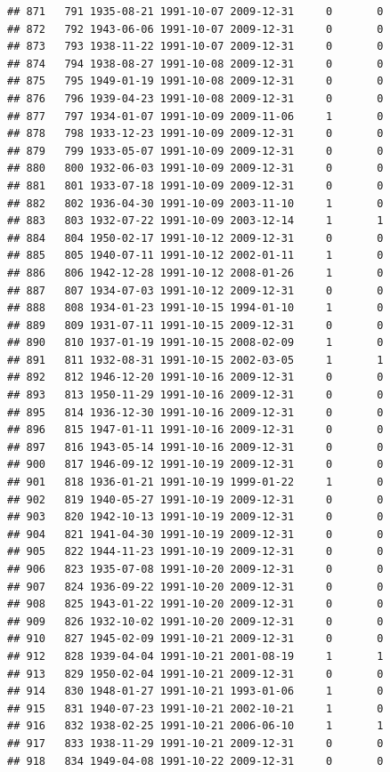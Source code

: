 \documentclass[
]{book}
\begin{document}
\begin{verbatim}
## 871   791 1935-08-21 1991-10-07 2009-12-31     0       0
## 872   792 1943-06-06 1991-10-07 2009-12-31     0       0
## 873   793 1938-11-22 1991-10-07 2009-12-31     0       0
## 874   794 1938-08-27 1991-10-08 2009-12-31     0       0
## 875   795 1949-01-19 1991-10-08 2009-12-31     0       0
## 876   796 1939-04-23 1991-10-08 2009-12-31     0       0
## 877   797 1934-01-07 1991-10-09 2009-11-06     1       0
## 878   798 1933-12-23 1991-10-09 2009-12-31     0       0
## 879   799 1933-05-07 1991-10-09 2009-12-31     0       0
## 880   800 1932-06-03 1991-10-09 2009-12-31     0       0
## 881   801 1933-07-18 1991-10-09 2009-12-31     0       0
## 882   802 1936-04-30 1991-10-09 2003-11-10     1       0
## 883   803 1932-07-22 1991-10-09 2003-12-14     1       1
## 884   804 1950-02-17 1991-10-12 2009-12-31     0       0
## 885   805 1940-07-11 1991-10-12 2002-01-11     1       0
## 886   806 1942-12-28 1991-10-12 2008-01-26     1       0
## 887   807 1934-07-03 1991-10-12 2009-12-31     0       0
## 888   808 1934-01-23 1991-10-15 1994-01-10     1       0
## 889   809 1931-07-11 1991-10-15 2009-12-31     0       0
## 890   810 1937-01-19 1991-10-15 2008-02-09     1       0
## 891   811 1932-08-31 1991-10-15 2002-03-05     1       1
## 892   812 1946-12-20 1991-10-16 2009-12-31     0       0
## 893   813 1950-11-29 1991-10-16 2009-12-31     0       0
## 895   814 1936-12-30 1991-10-16 2009-12-31     0       0
## 896   815 1947-01-11 1991-10-16 2009-12-31     0       0
## 897   816 1943-05-14 1991-10-16 2009-12-31     0       0
## 900   817 1946-09-12 1991-10-19 2009-12-31     0       0
## 901   818 1936-01-21 1991-10-19 1999-01-22     1       0
## 902   819 1940-05-27 1991-10-19 2009-12-31     0       0
## 903   820 1942-10-13 1991-10-19 2009-12-31     0       0
## 904   821 1941-04-30 1991-10-19 2009-12-31     0       0
## 905   822 1944-11-23 1991-10-19 2009-12-31     0       0
## 906   823 1935-07-08 1991-10-20 2009-12-31     0       0
## 907   824 1936-09-22 1991-10-20 2009-12-31     0       0
## 908   825 1943-01-22 1991-10-20 2009-12-31     0       0
## 909   826 1932-10-02 1991-10-20 2009-12-31     0       0
## 910   827 1945-02-09 1991-10-21 2009-12-31     0       0
## 912   828 1939-04-04 1991-10-21 2001-08-19     1       1
## 913   829 1950-02-04 1991-10-21 2009-12-31     0       0
## 914   830 1948-01-27 1991-10-21 1993-01-06     1       0
## 915   831 1940-07-23 1991-10-21 2002-10-21     1       0
## 916   832 1938-02-25 1991-10-21 2006-06-10     1       1
## 917   833 1938-11-29 1991-10-21 2009-12-31     0       0
## 918   834 1949-04-08 1991-10-22 2009-12-31     0       0

\end{verbatim}
\end{document}
